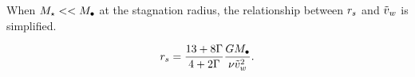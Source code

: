 
When $M_{\star} << M_{\bullet}$ at the stagnation radius, the relationship
between $r_s$ and $\tilde{v}_{w}$ is simplified.

\begin{align}
r_s=\frac{13+8\Gamma}{4+2\Gamma} \frac{G M_{\bullet}}{\nu \tilde{v}_{w}^2}.
\end{align}


